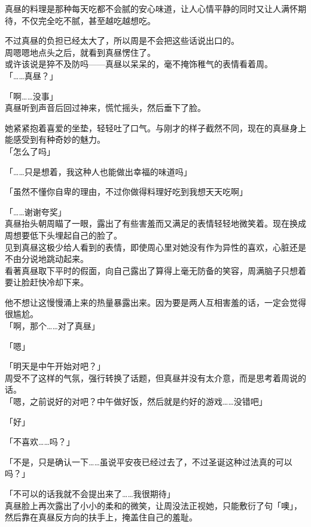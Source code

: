 真昼的料理是那种每天吃都不会腻的安心味道，让人心情平静的同时又让人满怀期待，不仅完全吃不腻，甚至越吃越想吃。

不过真昼的负担已经太大了，所以周是不会把这些话说出口的。\\

周嗯嗯地点头之后，就看到真昼愣住了。\\

或许该说是猝不及防吗——真昼以呆呆的，毫不掩饰稚气的表情看着周。\\

「……真昼？」

「啊……没事」\\

真昼听到声音后回过神来，慌忙摇头，然后垂下了脸。

她紧紧抱着喜爱的坐垫，轻轻吐了口气。与刚才的样子截然不同，现在的真昼身上能感受到有种奇妙的魅力。\\

「怎么了吗」

「……只是想着，我这种人也能做出幸福的味道吗」

「虽然不懂你自卑的理由，不过你做得料理好吃到我想天天吃啊」

「……谢谢夸奖」\\

真昼抬头朝周瞄了一眼，露出了有些害羞而又满足的表情轻轻地微笑着。现在换成周想要低下头埋起自己的脸了。\\

见到真昼这极少给人看到的表情，即使周心里对她没有作为异性的喜欢，心脏还是不由分说地跳动起来。\\

看著真昼取下平时的假面，向自己露出了算得上毫无防备的笑容，周满脑子只想着要让脸赶快冷却下来。

他不想让这慢慢涌上来的热量暴露出来。因为要是两人互相害羞的话，一定会觉得很尴尬。\\

「啊，那个……对了真昼」

「嗯」

「明天是中午开始对吧？」\\

周受不了这样的气氛，强行转换了话题，但真昼并没有太介意，而是思考着周说的话。\\

「嗯，之前说好的对吧？中午做好饭，然后就是约好的游戏……没错吧」

「好」

「不喜欢……吗？」

「不是，只是确认一下……虽说平安夜已经过去了，不过圣诞这种过法真的可以吗？」

「不可以的话我就不会提出来了……我很期待」\\

真昼脸上再次露出了小小的柔和的微笑，让周没法正视她，只能敷衍了句「噢」，然后靠在真昼反方向的扶手上，掩盖住自己的羞耻。

